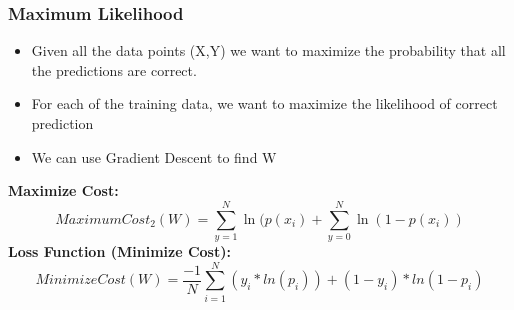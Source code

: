 \subsubsection{Maximum Likelihood}
\begin{itemize}
    \item Given all the data points (X,Y) we want to maximize the probability that all the predictions are correct.
    \item For each of the training data, we want to maximize the likelihood of correct prediction
    \item We can use Gradient Descent to find W
\end{itemize}
\begin{center}
    \textbf{Maximize Cost:}\\
    \[ Maximum Cost_{2}(W) = \sum_{y=1}^{N} \ln(p(x_{i}) + \sum_{y=0}^{N} \ln(1-p(x_{i})) \]
    \textbf{Loss Function (Minimize Cost):}\\
    \[ Minimize Cost(W) = \frac{-1}{N} \displaystyle\sum_{i = 1}^{N} (y_i * ln(p_i)) + (1 - y_i) * ln(1 - p_i)\]
\end{center}